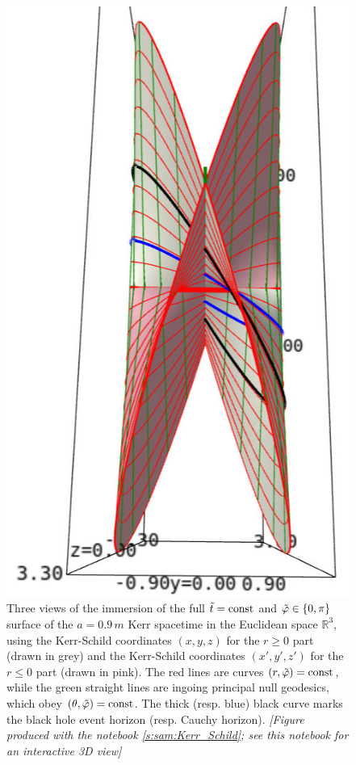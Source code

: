 \begin{figure}
\begin{minipage}[c]{0.33\textwidth}
\end{minipage}
\hfill
\begin{minipage}[c]{0.2\textwidth}
\includegraphics[height=0.3\textheight]{ksm_2_sheets_top.jpg}
\end{minipage}
\caption[]{\label{f:ksm:2_sheets} \footnotesize
Three views of the
immersion of the full ${\tilde t}=\mathrm{const}$ and ${\tilde\varphi}\in\{0,\pi\}$ surface of the $a=0.9\, m$
Kerr spacetime in the Euclidean space $\mathbb{R}^3$, using the Kerr-Schild coordinates
$(x,y,z)$ for the $r\geq 0$ part (drawn in grey) and the Kerr-Schild coordinates
$(x',y',z')$ for the $r\leq 0$ part (drawn in pink). The red lines are curves
$(r,{\tilde\varphi})=\mathrm{const}$, while the green straight lines are ingoing principal null
geodesics, which obey $(\theta,{\tilde\varphi}) = \mathrm{const}$. The thick (resp. blue) black curve marks the black hole event horizon (resp. Cauchy horizon).
\textsl{[Figure produced with the notebook \ref{s:sam:Kerr_Schild}; see this notebook
for an interactive 3D view]}
}
\end{figure}


